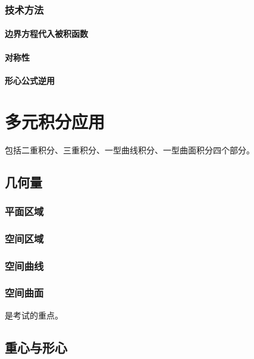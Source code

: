 \documentclass[UTF8, 12pt]{ctexart}
\begin{document}
        \subsubsection{技术方法}

        \paragraph{边界方程代入被积函数} \leavevmode \medskip

        \paragraph{对称性} \leavevmode \medskip

        \paragraph{形心公式逆用} \leavevmode \medskip

        \section{多元积分应用}

        包括二重积分、三重积分、一型曲线积分、一型曲面积分四个部分。

        \subsection{几何量}

        \subsubsection{平面区域}

        \subsubsection{空间区域}

        \subsubsection{空间曲线}

        \subsubsection{空间曲面}

        是考试的重点。

        \subsection{重心与形心}
\end{document}
